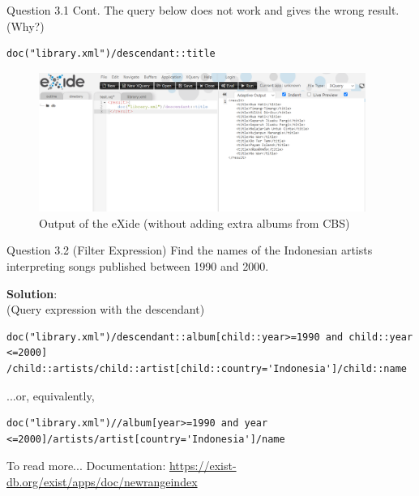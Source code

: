 \begin{frame}[fragile]{Question 3.1 Cont.}
The query below does not work and gives the wrong result. (Why?)\\ \vspace{5pt}
\begin{lstlisting}[style=xml-small-nomargin]
doc("library.xml")/descendant::title
\end{lstlisting}

\begin{figure}
	\includegraphics[width=0.95\textwidth,frame]{4221-t7/q3_1_wrong_result.png}
	\caption{Output of the eXide (without adding extra albums from CBS)}
\end{figure}\vspace{-10pt}
\end{frame}
	
\begin{frame}[fragile]{Question 3.2 (Filter Expression)}
Find the names of the Indonesian artists interpreting songs published between 1990 and 2000.

\textbf{Solution}: \\
(Query expression with the descendant)
\begin{lstlisting}[style=xml-small-nomargin]
doc("library.xml")/descendant::album[child::year>=1990 and child::year <=2000]
/child::artists/child::artist[child::country='Indonesia']/child::name
\end{lstlisting}\vspace{5pt}
...or, equivalently,
\begin{lstlisting}[style=xml-small-nomargin]
doc("library.xml")//album[year>=1990 and year <=2000]/artists/artist[country='Indonesia']/name
\end{lstlisting}\vspace{5pt}

\begin{block}{To read more...}
	Documentation: \url{https://exist-db.org/exist/apps/doc/newrangeindex}
\end{block}
\end{frame}

